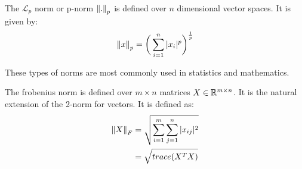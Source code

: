 \begin{defn}
The $\mathcal{L}_p$ norm or p-norm $\left\lVert.\right\rVert_p$ is defined over $n$ dimensional vector spaces. It is given by:
\begin{equation}
\left\lVert x\right\rVert_p = \bigg( \sum_{i=1}^{n} |x_i|^p \bigg)^\frac{1}{p}
\end{equation}
\end{defn}
These types of norms are most commonly used in statistics and mathematics.
\begin{defn}
The frobenius norm is defined over $m\times n$ matrices $X \in \mathbb{R}^{m \times n}$. It is the natural extension of the 2-norm for vectors. It is defined as: 
\begin{equation}
\begin{split}
\left\lVert X\right\rVert_F &= \sqrt{\sum_{i=1}^{m}\sum_{j=1}^{n}|x_{ij}|^2}\\
&= \sqrt{trace(X^TX)} \\
\end{split}
\end{equation}
\end{defn}